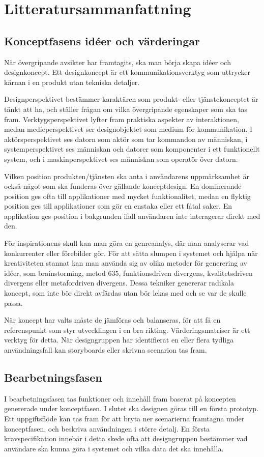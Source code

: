 \documentclass[a4paper,12pt,titlepage]{article}
\begin{document}
\section*{Litteratursammanfattning}
\subsection*{Konceptfasens idéer och värderingar}

När övergripande avsikter har framtagits, ska man börja skapa idéer och
designkoncept. Ett designkoncept är ett kommunikationsverktyg som uttrycker kärnan i en
produkt utan tekniska detaljer. 

Designperspektivet bestämmer karaktären som produkt- eller tjänstekonceptet är tänkt
att ha, och ställer frågan om vilka övergripande egenskaper som ska tas fram.
Verktygsperspektivet lyfter fram praktiska aspekter av interaktionen,
medan medieperspektivet ser designobjektet som medium för kommunikation.
I aktörsperspektivet ses datorn som aktör som tar kommandon av människan, i
systemperspektivet ses människan och datorer som komponenter i ett funktionellt
system, och i maskinperspektivet ses människan som operatör över datorn.

Vilken position produkten/tjänsten ska anta i användarens uppmärksamhet 
är också något som ska funderas över gällande konceptdesign.
En dominerande position ges ofta till applikationer med mycket funktionalitet,
medan en flyktig position ges till applikationer som gör en enstaka eller ett
fåtal saker. En applikation ges position i bakgrunden ifall användaren inte
interagerar direkt med den.

För inspirationens skull kan man göra en genreanalys, där man analyserar vad
konkurrenter eller förebilder gör. För att sätta slumpen i systemet och hjälpa
när kreativiteten stannat kan man
använda sig av olika metoder för generering av idéer, som brainstorming, metod
635, funktionsdriven divergens, kvalitetsdriven divergens eller metafordriven
divergens. Dessa tekniker genererar radikala koncept, som inte bör direkt
avfärdas utan bör lekas med och se var de skulle passa.

När koncept har valts måste de jämföras och balanseras, för att få en referenspunkt som
styr utvecklingen i en bra rikting. Värderingsmatriser är ett verktyg för detta.
När designgruppen har identifierat en eller flera tydliga användningsfall kan storyboards
eller skrivna scenarion tas fram.

\subsection*{Bearbetningsfasen}

I bearbetningsfasen tas funktioner och innehåll fram baserat på koncepten genererade
under konceptfasen. I slutet ska designen göras till en första prototyp. 
Ett uppgiftsflöde kan tas fram för att bryta ner scenarierna framtagna under konceptfasen,
och beskriva användningen i större detalj. En första kravspecifikation innebär i 
detta skede ofta att designgruppen bestämmer vad användare ska kunna göra i systemet 
och vilka data det ska innehålla.
\end{document}
